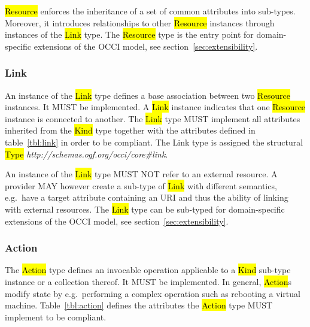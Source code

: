 \documentclass[10pt,a4paper,british]{article}
\begin{document}
\hl{Resource} enforces the inheritance of a set of common attributes into
sub-types. Moreover, it introduces relationships to other \hl{Resource}
instances through instances of the \hl{Link} type.
%
The \hl{Resource} type is the entry point for domain-specific extensions of the
OCCI model, see section~\ref{sec:extensibility}.

\subsubsection{Link}
\label{sec:link}
An instance of the \hl{Link} type defines a base association between two
\hl{Resource} instances. It MUST be implemented. A \hl{Link} instance indicates
that one \hl{Resource} instance is connected to another.
%
The \hl{Link} type MUST implement all attributes inherited from the
\hl{Kind} type together with the attributes defined in table~\ref{tbl:link}
in order to be compliant.
%
The Link type is assigned the structural \hl{Type}
\textit{http://schemas.ogf.org/occi/core\#link}.


An instance of the \hl{Link} type MUST NOT refer to an external resource.  A
provider MAY however create a sub-type of \hl{Link} with different semantics,
e.g.~have a target attribute containing an URI and thus the ability of linking
with external resources.
%
The \hl{Link} type can be sub-typed for domain-specific extensions of the
OCCI model, see section~\ref{sec:extensibility}.

\subsubsection{Action}
The \hl{Action} type defines an invocable operation applicable to a \hl{Kind}
sub-type instance or a collection thereof. It MUST be implemented. In general,
\hl{Action}s modify state by e.g.~performing a complex operation such as
rebooting a virtual machine.
%
Table~\ref{tbl:action} defines the attributes the \hl{Action} type MUST
implement to be compliant.
\end{document}
